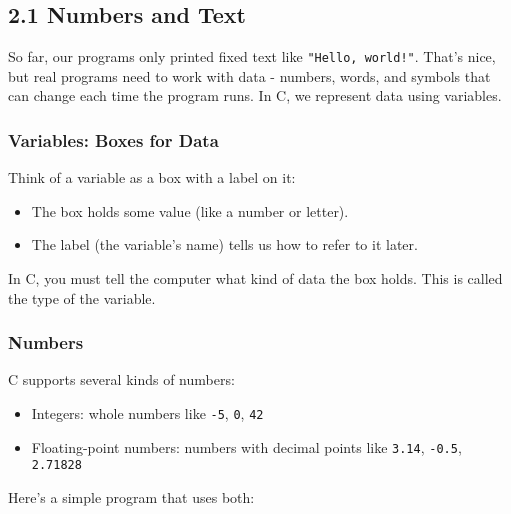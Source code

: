 \documentclass[
  letterpaper,
  DIV=11,
  numbers=noendperiod]{scrreprt}
\providecommand{\tightlist}{%
  \setlength{\itemsep}{0pt}\setlength{\parskip}{0pt}}
\begin{document}
\subsection{2.1 Numbers and Text}\label{numbers-and-text}

So far, our programs only printed fixed text like
\texttt{"Hello,\ world!"}. That's nice, but real programs need to work
with data - numbers, words, and symbols that can change each time the
program runs. In C, we represent data using variables.

\subsubsection{Variables: Boxes for
Data}\label{variables-boxes-for-data}

Think of a variable as a box with a label on it:

\begin{itemize}
\tightlist
\item
  The box holds some value (like a number or letter).
\item
  The label (the variable's name) tells us how to refer to it later.
\end{itemize}

In C, you must tell the computer what kind of data the box holds. This
is called the type of the variable.

\subsubsection{Numbers}\label{numbers}

C supports several kinds of numbers:

\begin{itemize}
\tightlist
\item
  Integers: whole numbers like \texttt{-5}, \texttt{0}, \texttt{42}
\item
  Floating-point numbers: numbers with decimal points like
  \texttt{3.14}, \texttt{-0.5}, \texttt{2.71828}
\end{itemize}

Here's a simple program that uses both:
\end{document}
